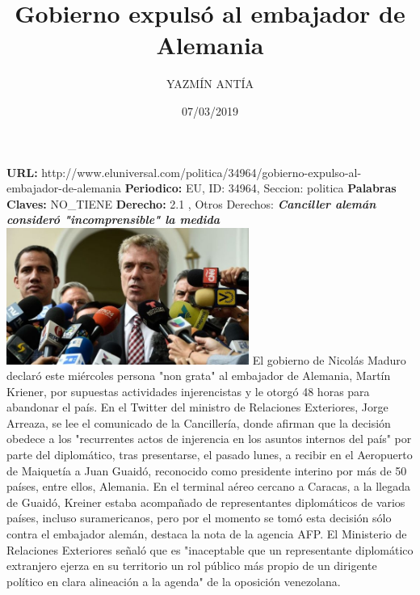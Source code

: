 \documentclass{article}%
\title{\textbf{Gobierno expulsó al embajador de Alemania}}%
\author{YAZMÍN ANTÍA}%
\date{07/03/2019}%
\begin{document}
%
\normalsize%
\maketitle%
\textbf{URL: }%
http://www.eluniversal.com/politica/34964/gobierno{-}expulso{-}al{-}embajador{-}de{-}alemania\newline%
%
\textbf{Periodico: }%
EU, %
ID: %
34964, %
Seccion: %
politica\newline%
%
\textbf{Palabras Claves: }%
NO\_TIENE\newline%
%
\textbf{Derecho: }%
2.1%
, Otros Derechos: %
\newline%
%
\textbf{\textit{Canciller alemán consideró "incomprensible" la medida}}%
\newline%
\newline%
%
\includegraphics[width=300px]{EU_34964.jpg}%
\newline%
%
El gobierno de Nicolás Maduro declaró este miércoles persona "non grata" al embajador de Alemania, Martín Kriener, por supuestas actividades injerencistas y le otorgó 48 horas para abandonar el país.%
\newline%
%
En el Twitter del ministro de Relaciones Exteriores, Jorge Arreaza, se lee el comunicado de la Cancillería, donde afirman que la decisión obedece a los "recurrentes actos de injerencia en los asuntos internos del país" por parte del diplomático, tras presentarse, el pasado lunes, a recibir en el Aeropuerto de Maiquetía a Juan Guaidó, reconocido como presidente interino por más de 50 países, entre ellos, Alemania.%
\newline%
%
En el terminal aéreo cercano a Caracas, a la llegada de Guaidó, Kreiner estaba acompañado de representantes diplomáticos de varios países, incluso suramericanos, pero por el momento se tomó esta decisión sólo contra el embajador alemán, destaca la nota de la agencia AFP.%
\newline%
%
El Ministerio de Relaciones Exteriores señaló  que es "inaceptable que un representante diplomático extranjero ejerza en su territorio un rol público más propio de un dirigente político en clara alineación a la agenda" de la oposición venezolana.%
\end{document}
